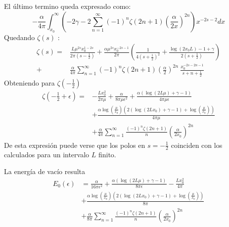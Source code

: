 El último termino queda expresado como:
\begin{equation}
- \frac{\alpha}{4 \pi}
\int _{x_0} ^{\infty}
\left(
-2 \gamma -
2 \sum _{n=1} ^{\infty} 
(-1) ^{n}
\zeta (2n+1) 
\left( \frac{\alpha}{2 x} \right) ^{2n}
\right)
x ^{-2s-2} dx
\end{equation}
Quedando $\zeta  (s) $ :
\begin{align}
	\zeta (s)=
&
\nonumber
	\frac{L  \mu ^{2s} x _0 ^{1-2s} }{2 \pi \left( s- \frac{1}{2} \right)}  + 
	\frac{\alpha \mu ^{2s} x _{0} ^{-2s-1} }{2 \pi} 
	\left( 
	\frac{1}{4 \left(s+ \frac{1}{2} \right) ^2} +
	\frac{\log(2 x _0 L) -1 + \gamma}{2 \left(s+\frac{1}{2} \right)} 
	\right) 
\\
+
&	
	\frac{\alpha }{4\pi} 
	\sum _{n=1} ^{\infty} (-1) ^{n} \zeta (2n+1) 
	\left( \frac{\alpha}{2 } \right) ^{2n} \ \frac{x _0 ^{-2s-2n-1}}{s+n+ \frac{1}{2}}
\end{align}
Obteniendo para $\zeta \left( - \frac{1}{2} \right)$
\begin{align}
	\zeta \left(- \frac{1}{2} + \epsilon \right)=
&
\nonumber
	-
	\frac{L x _0 ^2}{2 \pi \mu}+ 
	\frac{\alpha}{8 \pi \mu  \epsilon  ^2} +
	\frac{\alpha \left( \log (2 L \mu ) + \gamma -1  \right)}{4 \pi \mu  \epsilon }
\\
\nonumber
&
+
	\frac{\alpha \log \left( \frac{\mu}{x _0} \right) 	
		\left( 2 (\log ( 2 L x_0) + \gamma -1 ) + \log \left( \frac{\mu}{x _0}\right)  \right) }{4 \pi \mu}
\\
&
+	
	\frac{\alpha }{4\pi} 
	\sum _{n=1} ^{\infty} \frac{(-1) ^{n} \zeta (2n+1) }{n}  
	\left( \frac{\alpha}{2 x _0} \right) ^{2n}
\end{align}
De esta expresión puede verse que los polos en $s = -\frac{1}{2}$ coinciden con los calculados para un intervalo $L$ finito.

La energía de vacío resulta
\begin{align}
\label{eq.energia.cotinua}
	E _0 ( \epsilon ) 
&	
	=
\nonumber
	\frac{\alpha}{16 \pi  \epsilon  ^2} +
	\frac{\alpha \left( \log (2 L \mu ) + \gamma -1  \right)}{8 \pi \epsilon } -
	\frac{L x _0 ^2}{4 \pi}
\\
\nonumber
&
+
	\frac{\alpha \log \left( \frac{\mu}{x _0} \right) 	
		\left( 2 (\log ( 2 L x_0) + \gamma -1 ) + \log \left( \frac{\mu}{x _0}\right)  \right) }{8 \pi}
\\
&
+	
	\frac{\alpha }{8 \pi} 
	\sum _{n=1} ^{\infty} \frac{(-1) ^{n} \zeta (2n+1) }{n}  
	\left( \frac{\alpha}{2 x _0} \right) ^{2n}
\end{align}

